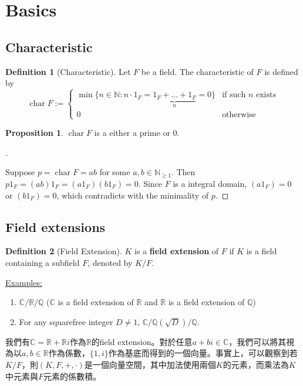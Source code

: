 \documentclass[12pt]{article}
\theoremstyle{definition}
\newcommand{\ex}{\noindent\underline{Examples:}}
\newtheorem{dfn}{Definition}
\newtheorem{prop}{Proposition}
\newenvironment{proofs}[1][\proofname]{%
  \begin{proof}[#1]$ $\par\nobreak\ignorespaces
}{%
  \end{proof}
}
\newcommand{\CC}{\mathbb C}
\newcommand{\NN}{\mathbb N}
\newcommand{\QQ}{\mathbb Q}
\newcommand{\RR}{\mathbb R}
\DeclareMathOperator{\Char}{char}
\begin{document}
\section{Basics}

\subsection{Characteristic}

\begin{dfn}[Characteristic]
	Let $F$ be a field. The characteristic of $F$ is defined by
	$$\Char F := \begin{cases*} \min\{n\in\NN : n\cdot 1_F=\underbrace{1_F+\dots+ 1_F}_n = 0\} & \text{if such $n$ exists}\\ 0 & \text{otherwise}\end{cases*}$$
\end{dfn}

\begin{prop} $\Char F$ is a either a prime or $0$.
\end{prop}

\begin{proofs}
	Suppose $p=\Char F=ab$ for some $a,b\in \NN_{\ge 1}$. Then $p1_F=(ab)1_F=(a1_F)(b1_F)=0$. Since $F$ is a integral domain, $(a1_F)=0$ or $(b1_F)=0$, which contradicts with the minimality of $p$.
\end{proofs}

\subsection{Field extensions}

\begin{dfn}[Field Extension]
	$K$ is a \textbf{field extension} of $F$ if $K$ is a field containing a subfield $F$, denoted by $K/F$.
\end{dfn}

\ex

\begin{enumerate}
	\item $\CC/\RR/\QQ$ ($\CC$ is a field extension of $\RR$ and $\RR$ is a field extension of $\QQ$)
	\item For any squarefree integer $D\neq 1$, $\CC / \QQ(\sqrt{D}) / \QQ$.
\end{enumerate}

我們有$\CC=\RR+\RR i$作為$\RR$的field extension。對於任意$a+bi\in\CC$，我們可以將其視為以$a,b\in \RR$作為係數，$\{1,i\}$作為基底而得到的一個向量。事實上，可以觀察到若$K/F$，則$(K,F,+,\cdot)$是一個向量空間，其中加法使用兩個$K$的元素，而乘法為$K$中元素與$F$元素的係數積。
\end{document}
